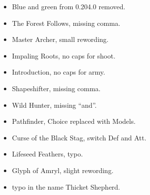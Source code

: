 
\subtitle{0.204.1}

\begin{itemize}[label={-}]
\item Blue and green from 0.204.0 removed.
\end{itemize}

%

\subtitle{Army Model Rules}

\begin{itemize}[label={-}]
\item The Forest Follows, missing comma.
\item Master Archer, small rewording.
\item Impaling Roots, no caps for shoot.
\end{itemize}

\subtitle{Kindreds and Aspects}

\begin{itemize}[label={-}]
\item Introduction, no caps for army.
\item Shapeshifter, missing comma.
\item Wild Hunter, missing \enquote{and}.
\item Pathfinder, Choice replaced with Models.
\end{itemize}

\subtitle{Special Equipment}

\begin{itemize}[label={-}]
\item Curse of the Black Stag, switch Def and Att.
\item Lifeseed Feathers, typo.
\item Glyph of Amryl, slight rewording.
\end{itemize}

\subtitle{Characters}

\begin{itemize}[label={-}]
\item typo in the name Thicket Shepherd.
\end{itemize}

%


